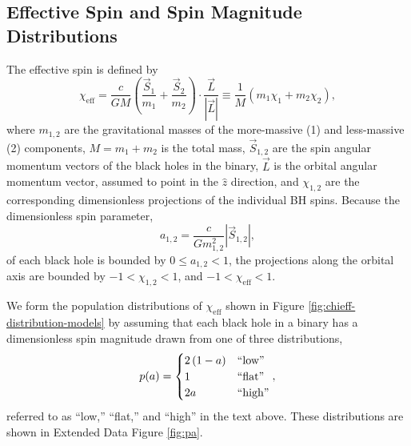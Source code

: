 \documentclass{nature-arxiv}
\newcommand{\chieff}{\chi_\mathrm{eff}}
\begin{document}
\begin{methods}

\setcounter{figure}{0}
\renewcommand{\figurename}{Extended Data Figure}
\renewcommand{\tablename}{Extended Data Table}

\section{Effective Spin and Spin Magnitude Distributions}
\label{methsec:chieff-spin-magnitude}

The effective spin is defined by\cite{2016PhRvL.116x1102A} 
\begin{equation}
  \chieff = \frac{c}{GM} \left( \frac{\vec{S}_1}{m_1} + \frac{\vec{S}_2}{m_2}
  \right) \cdot \frac{\vec{L}}{\left| \vec{L} \right|} \equiv \frac{1}{M} \left( m_1 \chi_1 + m_2 \chi_2 \right),
\end{equation}
where $m_{1,2}$ are the gravitational masses of the more-massive (1)
and less-massive (2) components, $M = m_1 + m_2$ is the total mass,
$\vec{S}_{1,2}$ are the spin angular momentum vectors of the black
holes in the binary, $\vec{L}$ is the orbital angular momentum vector,
assumed to point in the $\hat{z}$ direction, and $\chi_{1,2}$ are the
corresponding dimensionless projections of the individual \ac{BH}
spins.  Because the dimensionless spin parameter,
\begin{equation}
  \label{eq:a-def}
  a_{1,2} = \frac{c}{G m_{1,2}^2} \left|\vec{S}_{1,2} \right|,
\end{equation}
of each black hole is bounded by $0 \leq a_{1,2} < 1$, the projections
along the orbital axis are bounded by $-1 < \chi_{1,2} < 1$, and
$-1 < \chieff < 1$.

We form the population distributions of $\chieff$ shown in Figure
\ref{fig:chieff-distribution-models} by assuming that each black hole
in a binary has a dimensionless spin magnitude drawn from one of three
distributions,
\begin{equation}
  \label{eq:magnitude-dists}
  p(a) = \begin{cases}
    2\left(1-a \right) & \textnormal{``low''} \\
    1 & \textnormal{``flat''} \\
    2 a & \textnormal{``high''}
  \end{cases},
\end{equation}
referred to as ``low,'' ``flat,'' and ``high'' in the text above.
These distributions are shown in Extended Data Figure \ref{fig:pa}.


\end{methods}
\end{document}
